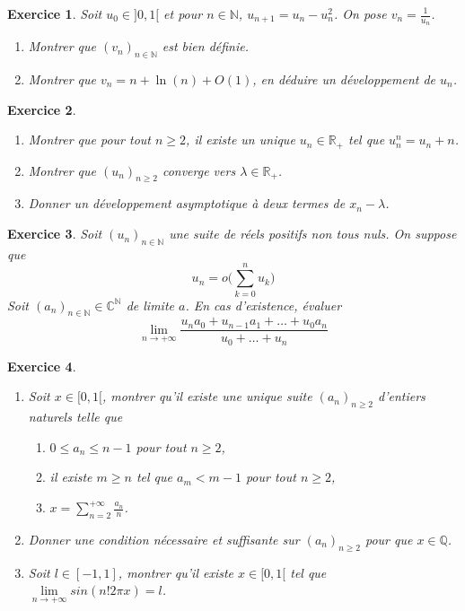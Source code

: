 \documentclass[12pt]{article}
\newtheorem{exercise}{Exercice}[section]
\theoremstyle{remark}
\theoremstyle{remark}
\newcommand{\R}{\mathbb{R}}
\newcommand{\C}{\mathbb{C}}
\newcommand{\Q}{\mathbb{Q}}
\newcommand{\N}{\mathbb{N}}
\begin{document}
\begin{exercise}
	Soit $u_{0}\in]0,1[$ et pour $n\in\N$, $u_{n+1}=u_{n}-u_{n}^{2}$. On pose
	$v_{n}=\frac{1}{u_{n}}$.
	\begin{enumerate}
		\item Montrer que $(v_{n})_{n\in\N}$ est bien définie.
		\item Montrer que $v_{n}=n+\ln(n)+O(1)$, en déduire un développement de $u_{n}$.
	\end{enumerate}
\end{exercise}

\begin{exercise}
	\phantom{}
	\begin{enumerate}
		\item Montrer que pour tout $n\geqslant 2$, il existe un unique
		$u_{n}\in\R_{+}$ tel que $u_{n}^{n}=u_{n}+n$.
		\item Montrer que $(u_{n})_{n\geqslant 2}$ converge vers $\lambda\in\R_{+}$.
		\item Donner un développement asymptotique à deux termes de $x_{n}-\lambda$.
	\end{enumerate}
\end{exercise}

\begin{exercise}
	Soit $(u_{n})_{n\in\N}$ une suite de réels positifs non tous nuls. On
	suppose que 
	$$u_n=o\Biggl(\sum_{k=0}^{n}u_{k}\Biggr)$$ 
	Soit
	$(a_{n})_{n\in\N}\in\C^{\N}$ de limite $a$. En cas d'existence, évaluer
	$$\lim\limits_{n\to+\infty}\frac{u_{n}a_{0}+u_{n-1}a_{1}+\dots+u_{0}a_{n}}{u_{0}+\dots+u_{n}}$$
\end{exercise}

\begin{exercise}
	\phantom{}
	\begin{enumerate}
		\item Soit $x\in[0,1[$, montrer qu'il existe une unique suite
		$(a_{n})_{n\geqslant 2}$ d'entiers naturels telle que 
		\begin{enumerate}
			\item [(i)] $0\leqslant a_{n}\leqslant n-1$ pour tout $n\geqslant2$,
			\item [(ii)] il existe $m\geqslant n$ tel que $a_{m}<m-1$ pour tout $n\geqslant2$,
			\item [(iii)] $x=\sum_{n=2}^{+\infty}\frac{a_{n}}{n}$.
		\end{enumerate}
		\item Donner une condition nécessaire et suffisante sur
		$(a_{n})_{n\geqslant2}$ pour que $x\in\Q$.
		\item Soit $l\in[-1,1]$, montrer qu'il existe $x\in[0,1[$ tel que $\lim\limits_{n\to+\infty}sin(n!2\pi x)=l$.
	\end{enumerate}
\end{exercise}
\end{document}
